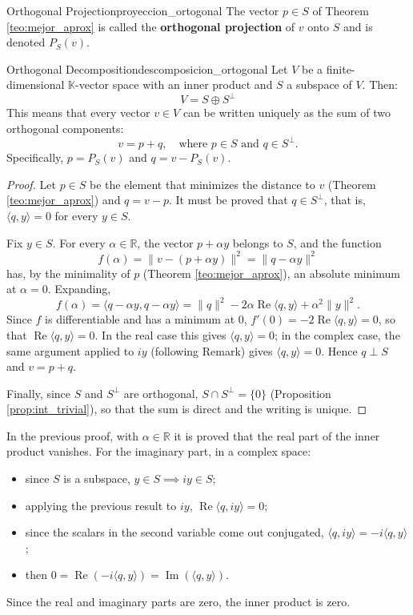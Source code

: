 \documentclass[11pt, a4paper]{article}
\begin{document}
\begin{definicion}{Orthogonal Projection}{proyeccion_ortogonal}
The vector $p \in S$ of Theorem \ref{teo:mejor_aprox} is called the \textbf{orthogonal projection} of $v$ onto $S$ and is denoted $P_S(v)$.
\end{definicion}

\begin{teorema}{Orthogonal Decomposition}{descomposicion_ortogonal}
Let $V$ be a finite-dimensional $\mathbb{K}$-vector space with an inner product and $S$ a subspace of $V$. Then:
\[
V = S \oplus S^\perp
\]
This means that every vector $v \in V$ can be written uniquely as the sum of two orthogonal components:
\[ v = p + q, \quad \text{where } p \in S \text{ and } q \in S^\perp. \]
Specifically, $p = P_S(v)$ and $q = v - P_S(v)$.
\end{teorema}

\begin{proof}
Let $p \in S$ be the element that minimizes the distance to $v$ (Theorem \ref{teo:mejor_aprox}) and $q = v - p$. It must be proved that $q \in S^\perp$, that is, $\langle q, y \rangle = 0$ for every $y \in S$.

Fix $y \in S$. For every $\alpha \in \mathbb{R}$, the vector $p + \alpha y$ belongs to $S$, and the function
\[
f(\alpha) = \|v - (p + \alpha y)\|^2 = \|q - \alpha y\|^2
\]
has, by the minimality of $p$ (Theorem \ref{teo:mejor_aprox}), an absolute minimum at $\alpha = 0$. Expanding,
\[
f(\alpha) = \langle q - \alpha y, q - \alpha y \rangle = \|q\|^2 - 2\alpha \operatorname{Re}\langle q, y \rangle + \alpha^2 \|y\|^2.
\]
Since $f$ is differentiable and has a minimum at $0$, $f'(0) = -2 \operatorname{Re}\langle q, y \rangle = 0$, so that $\operatorname{Re}\langle q, y \rangle = 0$. In the real case this gives $\langle q, y \rangle = 0$; in the complex case, the same argument applied to $iy$ (following Remark) gives $\langle q, y \rangle = 0$. Hence $q \perp S$ and $v = p + q$.

Finally, since $S$ and $S^\perp$ are orthogonal, $S \cap S^\perp = \{0\}$ (Proposition \ref{prop:int_trivial}), so that the sum is direct and the writing is unique.
\end{proof}

\obs In the previous proof, with $\alpha \in \mathbb{R}$ it is proved that the real part of the inner product vanishes. For the imaginary part, in a complex space:
\begin{itemize}
    \item since $S$ is a subspace, $y \in S \implies iy \in S$;
    \item applying the previous result to $iy$, $\operatorname{Re}\langle q, iy \rangle = 0$;
    \item since the scalars in the second variable come out conjugated, $\langle q, iy \rangle = -i \langle q, y \rangle$;
    \item then $0 = \operatorname{Re}(-i\langle q, y \rangle) = \operatorname{Im}(\langle q, y \rangle)$.
\end{itemize}
Since the real and imaginary parts are zero, the inner product is zero.
\end{document}
